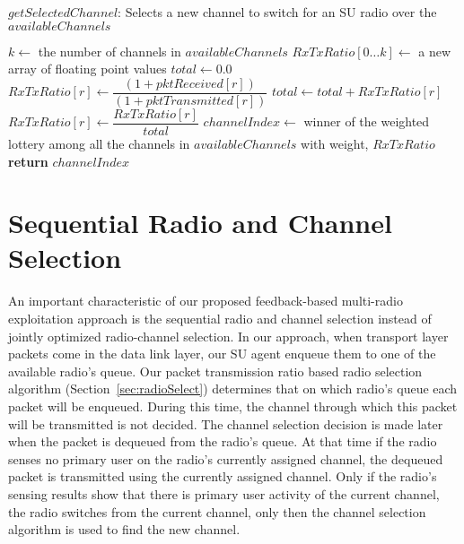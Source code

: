 \begin{algorithm}
\caption{$\mathit{getSelectedChannel}$: Selects a new channel to switch for an SU radio over the $\mathit{availableChannels}$}
\label{alg:getSelectedRadio}
\begin{algorithmic}[1]
\State $k \gets$ the number of channels in $\mathit{availableChannels}$
\State $\mathit{RxTxRatio} [0\ldots k] \gets $ a new array of floating point values
\State $\mathit{total} \gets 0.0$
\State $\mathit{RxTxRatio}[r] \gets \dfrac{(1+\mathit{pktReceived}[\mathit{r}])}{(1+\mathit{pktTransmitted}[\mathit{r}])}$
\State $\mathit{total} \gets \mathit{total} + \mathit{RxTxRatio}[r]$
\EndFor
{}
\State $\mathit{RxTxRatio}[r] \gets \dfrac{\mathit{RxTxRatio}[r]}{\mathit{total}}$
\EndFor
\State $\mathit{channelIndex} \gets$ winner of the weighted lottery among all the channels in $\mathit{availableChannels}$ with weight, $\mathit{RxTxRatio}$
\State \textbf{return} $\mathit{channelIndex}$
\EndFunction
\end{algorithmic}
\end{algorithm}

\section{Sequential Radio and Channel Selection}

An important characteristic of our proposed feedback-based multi-radio exploitation approach is the sequential radio and channel selection instead of jointly optimized radio-channel selection. In our approach, when transport layer packets come in the data link layer, our SU agent enqueue them to one of the available radio's queue. Our packet transmission ratio based radio selection algorithm (Section~\ref{sec:radioSelect}) determines that on which radio's queue each packet will be enqueued. During this time, the channel through which this packet will be transmitted is not decided. The channel selection decision is made later when the packet is dequeued from the radio's queue. At that time if the radio senses no primary user on the radio's currently assigned channel, the dequeued packet is transmitted using the currently assigned channel. Only if the radio's sensing results show that there is primary user activity of the current channel, the radio switches from the current channel, only then the channel selection algorithm is used to find the new channel.

